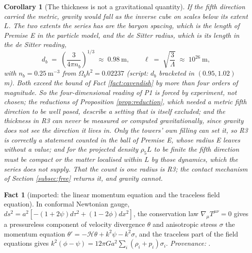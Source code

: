 \documentclass[11pt]{article}
\newtheorem{corollary}[theorem]{Corollary}
\theoremstyle{definition}
\newtheorem{fact}[theorem]{Fact}
\begin{document}
\begin{corollary}[The thickness is not a gravitational quantity]\label{cor:cavendish}
If the fifth direction carried the metric, gravity would fall as the inverse cube on scales below its extent $L$. The two extents the series has are the baryon spacing, which is the length of Premise E in the particle model, and the de Sitter radius, which is its length in the de Sitter reading,
\[
d_{b} \;=\; \left(\frac{3}{4\pi n_{b}}\right)^{1/3} \;\approx\; 0.98\ \mathrm{m}, \qquad \ell \;=\; \sqrt{\frac{3}{\Lambda}} \;\approx\; 10^{26}\ \mathrm{m},
\]
with $n_{b} = 0.25\ \mathrm{m}^{-3}$ from $\Omega_{b}h^{2} = 0.02237$ (script: $d_{b}$ bracketed in $(0.95, 1.02)$ m). Both exceed the bound of Fact \ref{fact:cavendish} by more than four orders of magnitude. So the four-dimensional reading of P1 is forced by experiment, not chosen; the reductions of Proposition \ref{prop:reduction}, which needed a metric fifth direction to be well posed, describe a setting that is itself excluded; and the thickness in R3 can never be measured or computed gravitationally, since gravity does not see the direction it lives in. Only the towers' own filling can set it, so R3 is correctly a statement counted in the ball of Premise E, whose radius E leaves without a value; and for the projected density $\rho_{5}L$ to be finite the fifth direction must be compact or the matter localised within $L$ by those dynamics, which the series does not supply. That the count is one radius is R3; the contact mechanism of Section \ref{subsec:free} returns it, and gravity cannot.
\end{corollary}

\begin{fact}[imported: the linear momentum equation and the traceless field equation]\label{fact:linpert}
In conformal Newtonian gauge, $ds^{2} = a^{2}[-(1 + 2\psi)d\tau^{2} + (1 - 2\phi)dx^{2}]$, the conservation law $\nabla_{\mu}T^{\mu\nu} = 0$ gives a pressureless component of velocity divergence $\theta$ and anisotropic stress $\sigma$ the momentum equation $\theta' = -\mathcal{H}\theta + k^{2}\psi - k^{2}\sigma$, and the traceless part of the field equations gives $k^{2}(\phi - \psi) = 12\pi G a^{2}\sum_{i}(\rho_{i} + p_{i})\sigma_{i}$. \emph{Provenance:} \cite[eqs.~(30), (23d)]{MaBertschinger1995}.
\end{fact}
\end{document}
